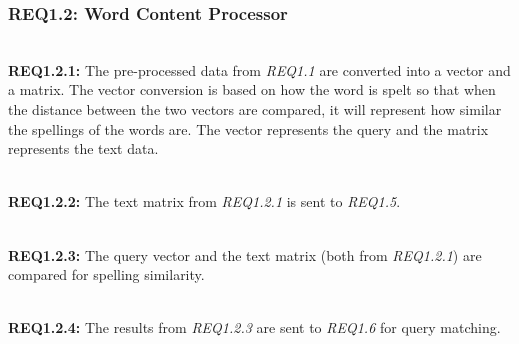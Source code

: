 \subsubsection{REQ1.2: Word Content Processor}


\textbf{\\REQ1.2.1:} The pre-processed data from \textit{REQ1.1} are converted into a vector and a matrix. The vector conversion is based on how the word is spelt so that when the distance between the two vectors are compared, it will represent how similar the spellings of the words are. The vector represents the query and the matrix represents the text data. \par

\textbf{\\REQ1.2.2:} The text matrix from \textit{REQ1.2.1} is sent to \textit{REQ1.5}. \par

\textbf{\\REQ1.2.3:} The query vector and the text matrix (both from \textit{REQ1.2.1}) are compared for spelling similarity. \par

\textbf{\\REQ1.2.4:} The results from \textit{REQ1.2.3} are sent to \textit{REQ1.6} for query matching. \par
